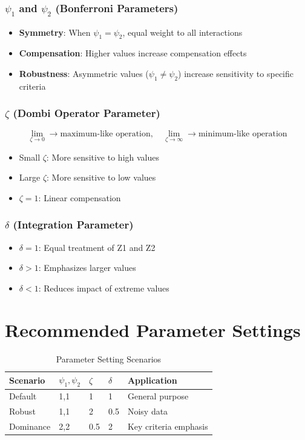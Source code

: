 \documentclass{article}
\begin{document}
\subsubsection{$\psi_1$ and $\psi_2$ (Bonferroni Parameters)}
\begin{itemize}
\item \textbf{Symmetry}: When $\psi_1 = \psi_2$, equal weight to all interactions
\item \textbf{Compensation}: Higher values increase compensation effects
\item \textbf{Robustness}: Asymmetric values ($\psi_1 \neq \psi_2$) increase sensitivity to specific criteria
\end{itemize}

\subsubsection{$\zeta$ (Dombi Operator Parameter)}
\begin{equation}
\lim_{\zeta \to 0} \rightarrow \text{maximum-like operation}, \quad \lim_{\zeta \to \infty} \rightarrow \text{minimum-like operation}
\end{equation}

\begin{itemize}
\item Small $\zeta$: More sensitive to high values
\item Large $\zeta$: More sensitive to low values
\item $\zeta=1$: Linear compensation
\end{itemize}

\subsubsection{$\delta$ (Integration Parameter)}
\begin{itemize}
\item $\delta=1$: Equal treatment of Z1 and Z2
\item $\delta>1$: Emphasizes larger values
\item $\delta<1$: Reduces impact of extreme values
\end{itemize}

\section{Recommended Parameter Settings}

\begin{table}[h]
\centering
\caption{Parameter Setting Scenarios}
\begin{tabular}{lllll}
\toprule
Scenario & $\psi_1,\psi_2$ & $\zeta$ & $\delta$ & Application \\
\midrule
Default & 1,1 & 1 & 1 & General purpose \\
Robust & 1,1 & 2 & 0.5 & Noisy data \\
Dominance & 2,2 & 0.5 & 2 & Key criteria emphasis \\
\bottomrule
\end{tabular}
\end{table}
\end{document}
